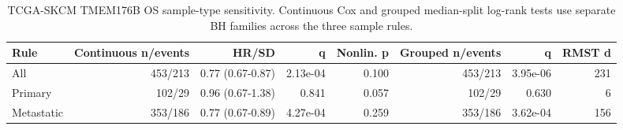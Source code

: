 \begin{table}[t]
\centering
\footnotesize
\caption{TCGA-SKCM TMEM176B OS sample-type sensitivity. Continuous Cox and grouped median-split log-rank tests use separate BH families across the three sample rules.}
\label{tab:skcm-tmem176b-sample-rule-sensitivity}
\begin{tabular}{lrrrrrrr}
\toprule
Rule & Continuous n/events & HR/SD & q & Nonlin. p & Grouped n/events & q & RMST d \\
\midrule
All & 453/213 & 0.77 (0.67-0.87) & 2.13e-04 & 0.100 & 453/213 & 3.95e-06 & 231 \\
Primary & 102/29 & 0.96 (0.67-1.38) & 0.841 & 0.057 & 102/29 & 0.630 & 6 \\
Metastatic & 353/186 & 0.77 (0.67-0.89) & 4.27e-04 & 0.259 & 353/186 & 3.62e-04 & 156 \\
\bottomrule
\end{tabular}
\end{table}

